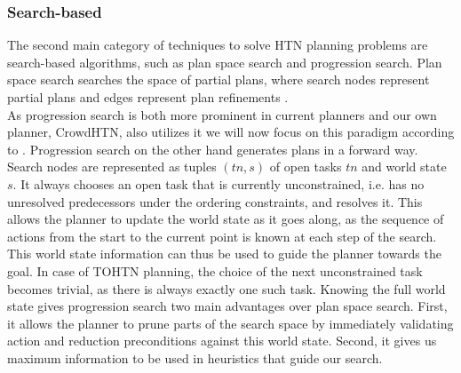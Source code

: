 \begin{comment}
- may translate to classical planning \cite{alford2016bound}
- SAT-based has been known since 1998 \cite{mali1998encoding}
- tend to explore the hierarchy layer-by-layer \cite{schreiber2019tree}
- this gives the search a BFS-like characteristic
- this is needed, as SAT is NP-complete compared to HTN which is undecidable and TOHTN which is in D-EXPTIME \ref{prelim: tohtn complexity}
- encoding the whole instance would be impossible in case of HTN and lead to blowup in instance size in case of TOHTN
- going bit by bit is done instead

- example planners are Tree-REX \cite{schreiber2019tree}, totSAT \cite{behnke2018totsat}, Lilotane \cite{schreiber2021lilotane}
\end{comment}

\subsubsection{Search-based}
\label{prelim: techniques search}
The second main category of techniques to solve HTN planning problems are search-based algorithms, such as plan space search and progression search. Plan space search searches the space of partial plans, where search nodes represent partial plans and edges represent plan refinements \cite{weld1994introduction}. \\
As progression search is both more prominent in current planners and our own planner, CrowdHTN, also utilizes it we will now focus on this paradigm according to \cite{holler2020htn}.
Progression search on the other hand generates plans in a forward way. Search nodes are represented as tuples $(tn, s)$ of open tasks $tn$ and world state $s$. It always chooses an open task that is currently unconstrained, i.e. has no unresolved predecessors under the ordering constraints, and resolves it. This allows the planner to update the world state as it goes along, as the sequence of actions from the start to the current point is known at each step of the search. This world state information can thus be used to guide the planner towards the goal. In case of TOHTN planning, the choice of the next unconstrained task becomes trivial, as there is always exactly one such task. Knowing the full world state gives progression search two main advantages over plan space search. First, it allows the planner to prune parts of the search space by immediately validating action and reduction preconditions against this world state. Second, it gives us maximum information to be used in heuristics that guide our search. \\
